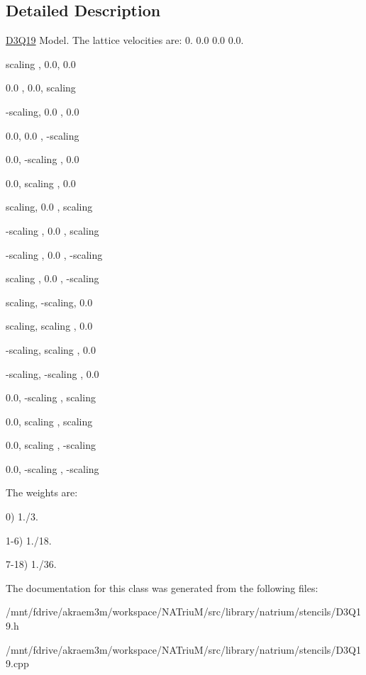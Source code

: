 \subsection{Detailed Description}
\hyperlink{classnatrium_1_1D3Q19}{D3Q19} Model. The lattice velocities are: 0. 0.0 0.0 0.0. 
\begin{DoxyEnumerate}
\item scaling , 0.0, 0.0
\item 0.0 , 0.0, scaling
\item -\/scaling, 0.0 , 0.0
\item 0.0, 0.0 , -\/scaling
\item 0.0, -\/scaling , 0.0
\item 0.0, scaling , 0.0
\item scaling, 0.0 , scaling
\item -\/scaling , 0.0 , scaling
\item -\/scaling , 0.0 , -\/scaling
\item scaling , 0.0 , -\/scaling
\item scaling, -\/scaling, 0.0
\item scaling, scaling , 0.0
\item -\/scaling, scaling , 0.0
\item -\/scaling, -\/scaling , 0.0
\item 0.0, -\/scaling , scaling
\item 0.0, scaling , scaling
\item 0.0, scaling , -\/scaling
\item 0.0, -\/scaling , -\/scaling
\end{DoxyEnumerate}

The weights are:
\begin{DoxyItemize}
\item 0) 1./3.
\item 1-\/6) 1./18.
\item 7-\/18) 1./36. 
\end{DoxyItemize}

The documentation for this class was generated from the following files:\begin{DoxyCompactItemize}
\item 
/mnt/fdrive/akraem3m/workspace/NATriuM/src/library/natrium/stencils/D3Q19.h\item 
/mnt/fdrive/akraem3m/workspace/NATriuM/src/library/natrium/stencils/D3Q19.cpp\end{DoxyCompactItemize}
